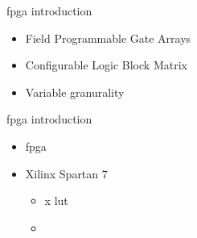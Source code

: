 \begin{frame}{\acrshort{fpga} introduction}
    \begin{itemize}
        \item Field Programmable Gate Arrays
        \item Configurable Logic Block Matrix
        \item Variable granurality
        
    \end{itemize}
\end{frame}

\begin{frame}{\acrshort{fpga} introduction}
    \begin{itemize}
        \item \acrfull{fpga}
        \item Xilinx Spartan 7 \cite{sp701} \cite{fpga_resources}
            \begin{itemize}
                \item x \gls{lut}
                \item {}
            \end{itemize}
    \end{itemize}
\end{frame}

